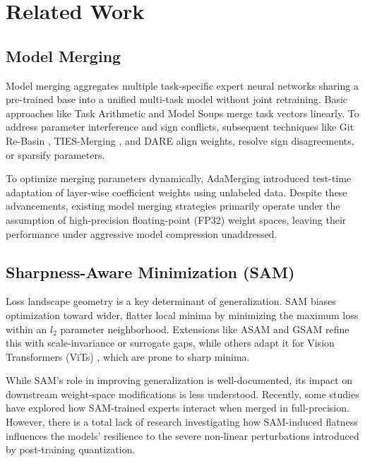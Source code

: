 \section{Related Work}
\label{sec:related}

\subsection{Model Merging}
Model merging aggregates multiple task-specific expert neural networks sharing a pre-trained base into a unified multi-task model without joint retraining. Basic approaches like Task Arithmetic \cite{Ilharco2022TaskArithmetic} and Model Soups \cite{Wortsman2022Soups} merge task vectors linearly. To address parameter interference and sign conflicts, subsequent techniques like Git Re-Basin \cite{Ainsworth2022GitReBasin}, TIES-Merging \cite{Yadav2023TIES}, and DARE \cite{Yu2023DARE} align weights, resolve sign disagreements, or sparsify parameters.

To optimize merging parameters dynamically, AdaMerging \cite{Yang2023AdaMerging} introduced test-time adaptation of layer-wise coefficient weights using unlabeled data. Despite these advancements, existing model merging strategies primarily operate under the assumption of high-precision floating-point (FP32) weight spaces, leaving their performance under aggressive model compression unaddressed.

\subsection{Sharpness-Aware Minimization (SAM)}
Loss landscape geometry is a key determinant of generalization. SAM \cite{Foret2020SAM} biases optimization toward wider, flatter local minima by minimizing the maximum loss within an $l_2$ parameter neighborhood. Extensions like ASAM \cite{Kwon2021ASAM} and GSAM \cite{Zhuang2022GSAM} refine this with scale-invariance or surrogate gaps, while others adapt it for Vision Transformers (ViTs) \cite{Chen2021SAMViT}, which are prone to sharp minima.

While SAM's role in improving generalization is well-documented, its impact on downstream weight-space modifications is less understood. Recently, some studies have explored how SAM-trained experts interact when merged in full-precision. However, there is a total lack of research investigating how SAM-induced flatness influences the models' resilience to the severe non-linear perturbations introduced by post-training quantization.


